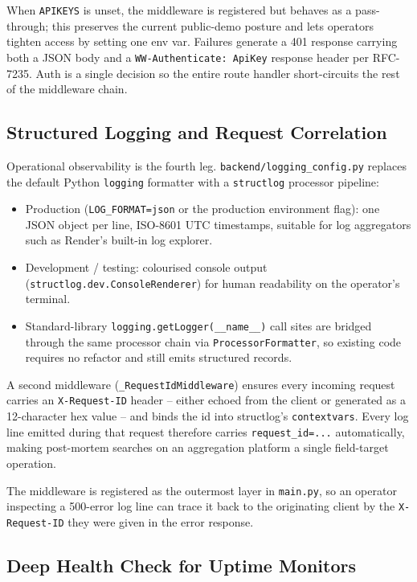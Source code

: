 When \texttt{APIKEYS} is unset, the middleware is registered but behaves as a pass-through; this preserves the current public-demo posture and lets operators tighten access by setting one env var. Failures generate a 401 response carrying both a JSON body and a \texttt{WW-Authenticate:\ ApiKey} response header per RFC-7235. Auth is a single decision so the entire route handler short-circuits the rest of the middleware chain.

\subsection{Structured Logging and Request Correlation}

Operational observability is the fourth leg. \texttt{backend/logging\_config.py} replaces the default Python \texttt{logging} formatter with a \texttt{structlog} processor pipeline:

\begin{itemize}
\item
  Production (\texttt{LOG\_FORMAT=json} or the production environment flag): one JSON object per line, ISO-8601 UTC timestamps, suitable for log aggregators such as Render's built-in log explorer.
\item
  Development / testing: colourised console output (\texttt{structlog.dev.ConsoleRenderer}) for human readability on the operator's terminal.
\item
  Standard-library \texttt{logging.getLogger(\_\_name\_\_)} call sites are bridged through the same processor chain via \texttt{ProcessorFormatter}, so existing code requires no refactor and still emits structured records.
\end{itemize}

A second middleware (\texttt{\_RequestIdMiddleware}) ensures every incoming request carries an \texttt{X-Request-ID} header -- either echoed from the client or generated as a 12-character hex value -- and binds the id into structlog's \texttt{contextvars}. Every log line emitted during that request therefore carries \texttt{request\_id=...} automatically, making post-mortem searches on an aggregation platform a single field-target operation.

The middleware is registered as the outermost layer in \texttt{main.py}, so an operator inspecting a 500-error log line can trace it back to the originating client by the \texttt{X-Request-ID} they were given in the error response.

\subsection{Deep Health Check for Uptime Monitors}

